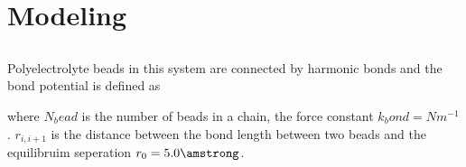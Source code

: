 
\chapter{Modeling}
\section{}
Polyelectrolyte beads in this system are connected by harmonic bonds and the bond potential is defined as 


where $N_bead$ is the number of beads in a chain, the force constant $k_bond = Nm^{-1}$. $r_{i,i+1}$ is the distance between the bond length between two beads and the equilibruim seperation $r_0 = 5.0\amstrong$. 








\cleardoublepage